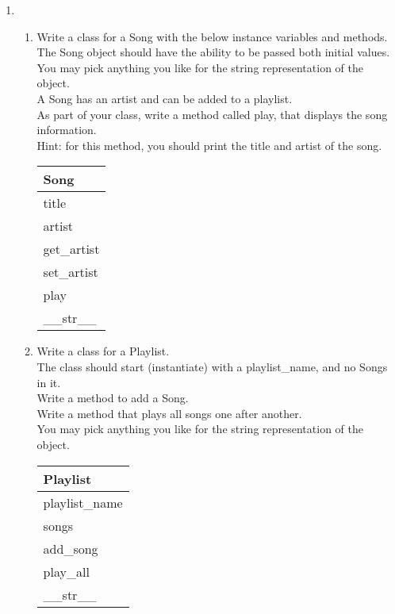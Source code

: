 \documentclass{article}
\begin{document}
\begin{enumerate}

	\item
	\begin{enumerate}
		\item
			Write a class for a Song with the below instance variables and methods.\\ 
			The Song object should have the ability to be passed both initial values.\\  
			You may pick anything you like for the string representation of the object.\\
			A Song has an artist and can be added to a playlist.\\  
			As part of your class, write a method called play, that displays the song information.\\
			Hint: for this method, you should print the title and artist of the song.
			\begin{flushright}
			\begin{tabular}{|l|}
				\hline
				Song\\ \hline
				title \\	artist\\	 \hline
				get\_artist \\ set\_artist \\ play \\ \_\_str\_\_ \\ \hline
			\end{tabular}
			\end{flushright}

		\item
			Write a class for a Playlist. \\
			The class should start (instantiate) with a playlist\_name, and no Songs in it. \\ 
			Write a method to add a Song.\\
			Write a method that plays all songs one after another.\\
			You may pick anything you like for the string representation of the object.
	
			\begin{flushright}
			\begin{tabular}{|l|}
				\hline
				Playlist\\ \hline  	%
				playlist\_name \\ songs\\ \hline		%
				add\_song \\ play\_all \\ \_\_str\_\_ \\ \hline		%
			\end{tabular}
			\end{flushright}


\end{enumerate}
\end{enumerate}
\end{document}
